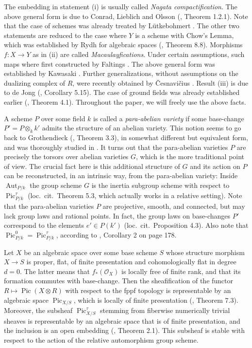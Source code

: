 \documentclass[oneside, 12pt]{amsart}
\theoremstyle{definition}
\theoremstyle{remark}
\newcommand{\Aut}{\operatorname{Aut}}
\renewcommand{\O}{\mathscr{O}}
\newcommand{\Pic}{\operatorname{Pic}}
\newcommand{\ra}{\rightarrow}
\begin{document}
The embedding  in statement (i) is usually called \emph{Nagata compactification}. The above  general form  is due
to   Conrad, Lieblich and Olsson (\cite{Conrad; Lieblich; Olsson 2012}, Theorem 1.2.1).
Note that the case of schemes was already treated by L\"utkebohmert \cite{Luetkebohmert 1993}.
The other two statements are reduced to the case where $Y$ is a scheme with Chow's Lemma,
which was established by Rydh for algebraic spaces (\cite{Rydh 2015}, Theorem 8.8).
Morphisms $f:X\ra Y$ as in    (ii)  are called \emph{Macaulayfications}. Under certain assumptions, such maps where
first constructed by Faltings \cite{Faltings 1978}. The above general form was established by  Kawasaki \cite{Kawasaki 2000}.
Further generalizations, without   assumptions on the dualizing complex of $R$,  were recently obtained by   \v{C}esnavi\v{c}ius \cite{Cesnavicius 2018}.
Result  (iii) is due to de Jong (\cite{de Jong 1997}, Corollary 5.15). The case of  ground fields was already
established earlier (\cite{de Jong 1996}, Theorem 4.1). Throughout the paper, we will freely use the above facts.

A scheme $P$ over some field $k$ is called a \emph{para-abelian variety} if some base-change $P'=P\otimes_kk'$ admits the
structure of an abelian variety. 
This  notion seems to go back to Grothendieck (\cite{FGA VI},  Theorem 3.3), in somewhat different but equivalent form, 
and was thoroughly studied in \cite{Laurent; Schroeer 2021}. It  turns out that the para-abelian varieties $P$
are precisely the torsors over abelian varieties $G$, which is the more traditional point of view.
The crucial fact here is  this additional structure of  $G$
and its action on $P$ can be reconstructed, in an intrinsic way,   from the para-abelian variety: Inside $\Aut_{P/k}$ the group scheme $G$ is the
inertia subgroup scheme with respect to   $\Pic^\tau_{P/k}$ (loc.\ cit.\ Theorem 5.3, which actually works in a relative setting).
Note that  the para-abelian varieties $P$ are projective, smooth, and connected, but may lack group laws and rational points.
In fact,  the  group laws on base-changes $P'$ correspond to the elements  $e'\in P(k')$ (loc.\ cit.\ Proposition 4.3).
Also note that $\Pic^0_{P/k}=\Pic^\tau_{P/k}$, according to \cite{Mumford 1970}, Corollary 2 on page 178.

Let $X$ be an algebraic space over some base scheme $S$ whose structure morphism $X\ra S$ is proper, flat, of finite presentation
and cohomologically flat in degree $d=0$. The latter means that $f_*(\O_X)$ is locally free of finite rank,
and that its formation commutes with base-change.
Then the sheafification of the functor $R\mapsto\Pic(X\otimes R)$ with respect to the fppf topology
is representable by an algebraic space $\Pic_{X/S}$, which is  locally of finite presentation  (\cite{Artin 1969}, Theorem 7.3).
Moreover, the subsheaf $\Pic^\tau_{X/S}$ stemming from fiberwise numerically trivial sheaves
is representable by an algebraic space that is  of finite presentation, and the inclusion is an open embedding (\cite{Laurent; Schroeer 2021}, Theorem 2.1).
This subsheaf is stable with respect to the action of the relative automorphism group scheme.
\end{document}
